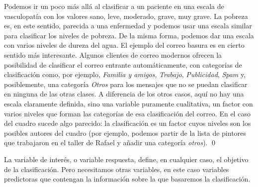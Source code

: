 \begin{ejemplo}
	\label{cap13:ejem:EjemplosClasificadores2}
Podemos ir un poco más allá  al clasificar a un paciente en una escala de vasculopatía con los valores sano, leve, moderado, grave, muy grave. La pobreza es, en este sentido, parecida a una enfermedad y podemos usar una escala similar para clasificar los niveles de pobreza. De la misma forma, podemos dar una escala con varios niveles de dureza del agua. El ejemplo del correo basura es en cierto sentido más interesante. Algunos clientes de correo modernos ofrecen la posibilidad de clasificar el correo entrante automáticamente, con categorías de clasificación como, por ejemplo, {\em Familia y amigos}, {\em Trabajo}, {\em Publicidad},  {\em Spam} y, posiblemente, una categoría {\em Otros} para los mensajes que no se puedan clasificar en ninguna de las otras clases. A diferencia de los otros casos, aquí no hay una escala claramente definida, sino una variable puramente cualitativa, un factor con varios niveles que forman las categorías de esa clasificación del correo.
En el caso del cuadro sucede algo parecido: la clasificación es un factor cuyos niveles son los posibles autores del cuadro (por ejemplo, podemos partir de la lista de pintores que trabajaron en el taller de Rafael y añadir una categoría {\em otros}).
	\qed
\end{ejemplo}
La variable de interés, o variable respuesta, define, en cualquier caso, el objetivo de la clasificación. Pero necesitamos otras variables, en este caso variables predictoras que contengan la información sobre la que basaremos la clasificación.

